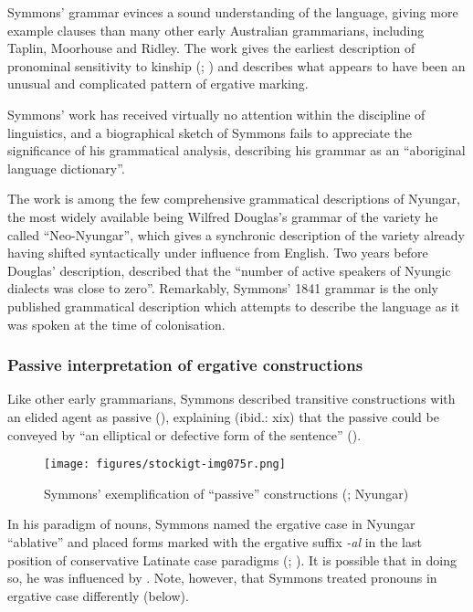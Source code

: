 Symmons' grammar evinces a sound understanding of the language, giving more example clauses than many other early Australian grammarians, including Taplin, Moorhouse and Ridley. The work gives the earliest description of pronominal sensitivity to kinship (\citealt[xiv-xv]{symmons_grammatical_1841}; ) and describes what appears to have been an unusual and complicated pattern of ergative marking.

Symmons' work has received virtually no attention within the discipline of linguistics, and a biographical sketch of Symmons \citep{conole_nodate} fails to appreciate the significance of his grammatical analysis, describing his grammar as an “aboriginal language dictionary”.

The work is among the few comprehensive grammatical descriptions of Nyungar, the most widely available being Wilfred Douglas’s \citeyear{douglas_aboriginal_1968} grammar of the variety he called ``Neo-Nyungar'', which gives a synchronic description of the variety already having shifted syntactically under influence from English. Two years before Douglas' description, \citet[30]{ogrady_languages_1966} described that the “number of active speakers of Nyungic dialects was close to zero”. Remarkably, Symmons' 1841 grammar is the only published grammatical description which attempts to describe the language as it was spoken at the time of colonisation.

\subsubsection{Passive interpretation of ergative constructions}
\label{sec:key:7.1.1.1}\label{bkm:Ref73466178}

Like other early grammarians, Symmons described transitive constructions with an elided agent as passive (), explaining (ibid.: xix) that the passive could be conveyed by “an elliptical or defective form of the sentence” ().


\begin{figure}
\texttt{[image: figures/stockigt-img075r.png]}
\caption{Symmons' exemplification of “passive” constructions (\citeyear[xx]{symmons_grammatical_1841}; Nyungar)}
\label{fig:key:129}
\end{figure}

In his paradigm of nouns, Symmons named the ergative case in Nyungar “ablative” and placed forms marked with the ergative suffix \textit{-al} in the last position of conservative Latinate case paradigms (\citeyear{symmons_grammatical_1841}; ). It is possible that in doing so, he was influenced by \citet{teichelmann_outlines_1840}. Note, however, that Symmons treated pronouns in ergative case differently (below).

